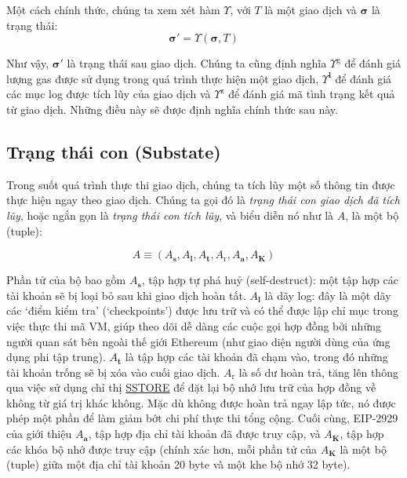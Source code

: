 \documentclass[9pt,oneside]{amsart}
\begin{document}
\begin{multicols}{2}
Một cách chính thức, chúng ta xem xét hàm \hyperlink{Upsilon_state_transition}{$\Upsilon$}, với $T$ là một giao dịch và $\boldsymbol{\sigma}$ là trạng thái:
\begin{equation}
\boldsymbol{\sigma}' = \Upsilon(\boldsymbol{\sigma}, T)
\end{equation}

Như vậy, $\boldsymbol{\sigma}'$ là trạng thái sau giao dịch. Chúng ta cũng định nghĩa \hyperlink{tx_total_gas_used_Upsilon_pow_g}{$\Upsilon^{\mathrm{g}}$} để đánh giá lượng gas được sử dụng trong quá trình thực hiện một giao dịch, \hyperlink{tx_logs_Upsilon_pow_l}{$\Upsilon^{\mathbf{l}}$} để đánh giá các mục log được tích lũy của giao dịch và \hyperlink{tx_status_Upsilon_pow_z}{$\Upsilon^{\mathrm{z}}$} để đánh giá mã tình trạng kết quả từ giao dịch. Những điều này sẽ được định nghĩa chính thức sau này.

\subsection{Trạng thái con (Substate)} \label{ch:substate}
Trong suốt quá trình thực thi giao dịch, chúng ta tích lũy một số thông tin được thực hiện ngay theo giao dịch. Chúng ta gọi đó là \textit{trạng thái con giao dịch đã tích lũy}, hoặc ngắn gọn là \textit{trạng thái con tích lũy}, và biểu diễn nó như là $A$, là một bộ (tuple):

\begin{equation}
A \equiv (A_{\mathbf{s}}, A_{\mathbf{l}}, A_{\mathbf{t}}, A_{\mathrm{r}}, A_{\mathbf{a}}, A_{\mathbf{K}})
\end{equation}

\hypertarget{self_destruct_set_wordy_defn_A__s}{}Phần tử của bộ bao gồm $A_{\mathbf{s}}$, tập hợp tự phá huỷ (self-destruct): một tập hợp các tài khoản sẽ bị loại bỏ sau khi giao dịch hoàn tất.
\hypertarget{tx_log_series_wordy_defn_A__l}{}$A_{\mathbf{l}}$ là dãy log: đây là một dãy các `điểm kiểm tra' (`checkpoints') được lưu trữ và có thể được lập chỉ mục trong việc thực thi mã VM, giúp theo dõi dễ dàng các cuộc gọi hợp đồng bởi những người quan sát bên ngoài thế giới Ethereum (như giao diện người dùng của ứng dụng phi tập trung).
\hypertarget{tx_touched_accounts_wordy_defn_A__t}{}$A_{\mathbf{t}}$ là tập hợp các tài khoản đã chạm vào, trong đó những tài khoản trống sẽ bị xóa vào cuối giao dịch.
\hypertarget{refund_balance_defn_words_A__r}{}$A_{\mathrm{r}}$ là số dư hoàn trả, tăng lên thông qua việc sử dụng chỉ thị \hyperlink{SSTORE}{{\small SSTORE}} để đặt lại bộ nhớ lưu trữ của hợp đồng về không từ giá trị khác không. Mặc dù không được hoàn trả ngay lập tức, nó được phép một phần để làm giảm bớt chi phí thực thi tổng cộng.
Cuối cùng, EIP-2929 của \cite{EIP-2929} giới thiệu \hypertarget{accessed_addresses_defn_words_A__a}{}$A_{\mathbf{a}}$, tập hợp địa chỉ tài khoản đã được truy cập, và \hypertarget{accessed_storage_keys_defn_words_A__k}{}$A_{\mathbf{K}}$, tập hợp các khóa bộ nhớ được truy cập (chính xác hơn, mỗi phần tử của $A_{\mathbf{K}}$ là một bộ (tuple) giữa một địa chỉ tài khoản 20 byte và một khe bộ nhớ 32 byte).


\end{multicols}
\end{document}
